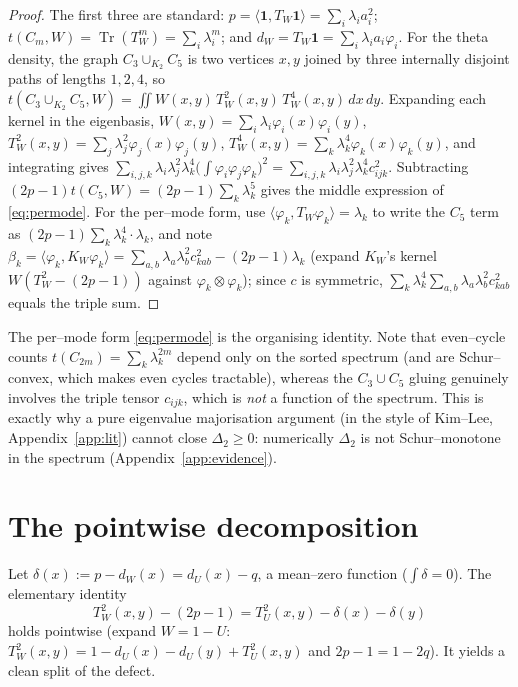\documentclass[11pt]{article}
\theoremstyle{definition}
\newcommand{\one}{\mathbf 1}
\newcommand{\Tr}{\operatorname{Tr}}
\newcommand{\tw}{T_W}
\newcommand{\tu}{T_U}
\newcommand{\kw}{K_W}
\begin{document}
\begin{proof}
The first three are standard: $p=\langle\one,\tw\one\rangle=\sum_i\lambda_i a_i^2$;
$t(C_m,W)=\Tr(\tw^m)=\sum_i\lambda_i^m$; and $d_W=\tw\one=\sum_i\lambda_i a_i\varphi_i$.
For the theta density, the graph $C_3\cup_{K_2}C_5$ is two vertices $x,y$ joined by
three internally disjoint paths of lengths $1,2,4$, so
$t(C_3\cup_{K_2}C_5,W)=\iint W(x,y)\,\tw^2(x,y)\,\tw^4(x,y)\,dx\,dy$.  Expanding
each kernel in the eigenbasis, $W(x,y)=\sum_i\lambda_i\varphi_i(x)\varphi_i(y)$,
$\tw^2(x,y)=\sum_j\lambda_j^2\varphi_j(x)\varphi_j(y)$,
$\tw^4(x,y)=\sum_k\lambda_k^4\varphi_k(x)\varphi_k(y)$, and integrating gives
$\sum_{i,j,k}\lambda_i\lambda_j^2\lambda_k^4\big(\int\varphi_i\varphi_j\varphi_k\big)^2
=\sum_{i,j,k}\lambda_i\lambda_j^2\lambda_k^4 c_{ijk}^2$.  Subtracting
$(2p-1)t(C_5,W)=(2p-1)\sum_k\lambda_k^5$ gives the middle expression of
\eqref{eq:permode}.  For the per--mode form, use
$\langle\varphi_k,\tw\varphi_k\rangle=\lambda_k$ to write the $C_5$ term as
$(2p-1)\sum_k\lambda_k^4\cdot\lambda_k$, and note
$\beta_k=\langle\varphi_k,\kw\varphi_k\rangle
=\sum_{a,b}\lambda_a\lambda_b^2 c_{kab}^2-(2p-1)\lambda_k$ (expand $\kw$'s kernel
$W(\tw^2-(2p-1))$ against $\varphi_k\otimes\varphi_k$); since $c$ is symmetric,
$\sum_k\lambda_k^4\sum_{a,b}\lambda_a\lambda_b^2 c_{kab}^2$ equals the triple sum.
\end{proof}

The per--mode form \eqref{eq:permode} is the organising identity.  Note that
even--cycle counts $t(C_{2m})=\sum_k\lambda_k^{2m}$ depend only on the sorted
spectrum (and are Schur--convex, which makes even cycles tractable), whereas the
$C_3\cup C_5$ gluing genuinely involves the triple tensor $c_{ijk}$, which is
\emph{not} a function of the spectrum.  This is exactly why a pure eigenvalue
majorisation argument (in the style of Kim--Lee, Appendix~\ref{app:lit}) cannot
close $\Delta_2\ge0$: numerically $\Delta_2$ is not Schur--monotone in the
spectrum (Appendix~\ref{app:evidence}).

\section{The pointwise decomposition}\label{sec:decomp}

Let $\delta(x):=p-d_W(x)=d_U(x)-q$, a mean--zero function ($\int\delta=0$).  The
elementary identity
\begin{equation}\label{eq:pointwise}
  \tw^2(x,y)-(2p-1)=\tu^2(x,y)-\delta(x)-\delta(y)
\end{equation}
holds pointwise (expand $W=1-U$: $\tw^2(x,y)=1-d_U(x)-d_U(y)+\tu^2(x,y)$ and
$2p-1=1-2q$).  It yields a clean split of the defect.
\end{document}
